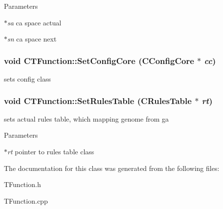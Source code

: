 \begin{DoxyParams}{Parameters}
\item[{\em $\ast$sa}]ca space actual \item[{\em $\ast$sn}]ca space next \end{DoxyParams}
\hypertarget{classCTFunction_ab629990f0e797774b7389e8bd07394a2}{
\subsubsection[{SetConfigCore}]{\setlength{\rightskip}{0pt plus 5cm}void CTFunction::SetConfigCore ({\bf CConfigCore} $\ast$ {\em cc})}}
\label{classCTFunction_ab629990f0e797774b7389e8bd07394a2}
sets config class \hypertarget{classCTFunction_ae1ba9e9f2baff1687236edc46b23d07f}{
\subsubsection[{SetRulesTable}]{\setlength{\rightskip}{0pt plus 5cm}void CTFunction::SetRulesTable ({\bf CRulesTable} $\ast$ {\em rt})}}
\label{classCTFunction_ae1ba9e9f2baff1687236edc46b23d07f}
sets actual rules table, which mapping genome from ga


\begin{DoxyParams}{Parameters}
\item[{\em $\ast$rt}]pointer to rules table class \end{DoxyParams}


The documentation for this class was generated from the following files:\begin{DoxyCompactItemize}
\item 
TFunction.h\item 
TFunction.cpp\end{DoxyCompactItemize}
